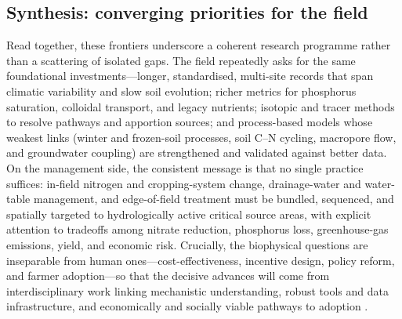\documentclass[11pt]{article}
\begin{document}
\subsection{Synthesis: converging priorities for the field}

Read together, these frontiers underscore a coherent research programme rather than a scattering of isolated gaps. The field repeatedly asks for the same foundational investments---longer, standardised, multi-site records that span climatic variability and slow soil evolution; richer metrics for phosphorus saturation, colloidal transport, and legacy nutrients; isotopic and tracer methods to resolve pathways and apportion sources; and process-based models whose weakest links (winter and frozen-soil processes, soil C--N cycling, macropore flow, and groundwater coupling) are strengthened and validated against better data. On the management side, the consistent message is that no single practice suffices: in-field nitrogen and cropping-system change, drainage-water and water-table management, and edge-of-field treatment must be bundled, sequenced, and spatially targeted to hydrologically active critical source areas, with explicit attention to tradeoffs among nitrate reduction, phosphorus loss, greenhouse-gas emissions, yield, and economic risk. Crucially, the biophysical questions are inseparable from human ones---cost-effectiveness, incentive design, policy reform, and farmer adoption---so that the decisive advances will come from interdisciplinary work linking mechanistic understanding, robust tools and data infrastructure, and economically and socially viable pathways to adoption \parencite{Ma2025,SKAGGS1994,Ferin2023,Kvítek2023,Baulch2019}.

\printbibliography
\end{document}
